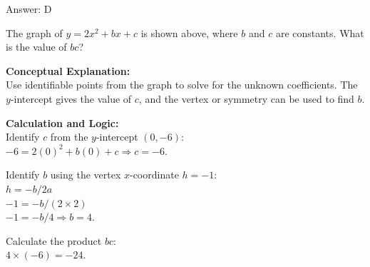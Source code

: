 \documentclass[11pt,paper=a4,answers]{exam}
\begin{document}
\begin{questions}
\begin{solution}
\vspace{25pt}

Answer: \colorbox{yellow!100}{D}
\end{solution}

\vspace{40pt}

\question
\begin{center}
\end{center}
The graph of $y = 2x^2 + bx + c$ is shown above, where $b$ and $c$ are constants. What is the value of $bc$?

\begin{solution}
\textbf{Conceptual Explanation:} \\
Use identifiable points from the graph to solve for the unknown coefficients. The $y$-intercept gives the value of $c$, and the vertex or symmetry can be used to find $b$.

\vspace{20pt}

\textbf{Calculation and Logic:} \\
Identify $c$ from the $y$-intercept $(0, -6)$: \\
$-6 = 2(0)^2 + b(0) + c \Rightarrow c = -6$.

\vspace{10pt}

Identify $b$ using the vertex $x$-coordinate $h = -1$: \\
$h = -b / 2a$ \\
$-1 = -b / (2 \times 2)$ \\
$-1 = -b / 4 \Rightarrow b = 4$.

\vspace{10pt}

Calculate the product $bc$: \\
$4 \times (-6) = -24$.

\vspace{25pt}


\end{solution}
\end{questions}
\end{document}
